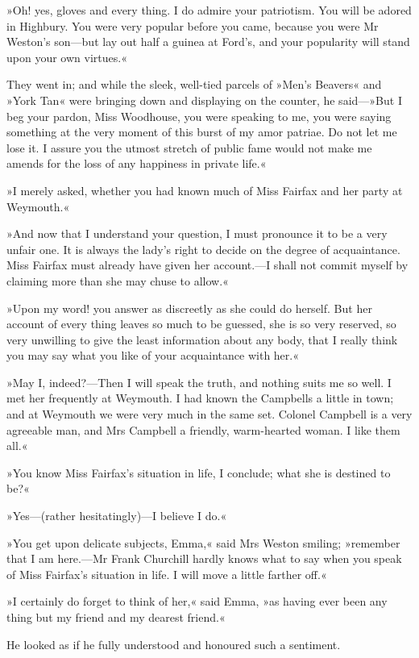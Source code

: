 »Oh! yes, gloves and every thing. I do admire your patriotism. You will be adored in Highbury. You were very popular before you came, because you were Mr Weston's son—but lay out half a guinea at Ford's, and your popularity will stand upon your own virtues.«

They went in; and while the sleek, well-tied parcels of »Men's Beavers« and »York Tan« were bringing down and displaying on the counter, he said—»But I beg your pardon, Miss Woodhouse, you were speaking to me, you were saying something at the very moment of this burst of my amor patriae. Do not let me lose it. I assure you the utmost stretch of public fame would not make me amends for the loss of any happiness in private life.«

»I merely asked, whether you had known much of Miss Fairfax and her party at Weymouth.«

»And now that I understand your question, I must pronounce it to be a very unfair one. It is always the lady's right to decide on the degree of acquaintance. Miss Fairfax must already have given her account.—I shall not commit myself by claiming more than she may chuse to allow.«

»Upon my word! you answer as discreetly as she could do herself. But her account of every thing leaves so much to be guessed, she is so very reserved, so very unwilling to give the least information about any body, that I really think you may say what you like of your acquaintance with her.«

»May I, indeed?—Then I will speak the truth, and nothing suits me so well. I met her frequently at Weymouth. I had known the Campbells a little in town; and at Weymouth we were very much in the same set. Colonel Campbell is a very agreeable man, and Mrs Campbell a friendly, warm-hearted woman. I like them all.«

»You know Miss Fairfax's situation in life, I conclude; what she is destined to be?«

»Yes—(rather hesitatingly)—I believe I do.«

»You get upon delicate subjects, Emma,« said Mrs Weston smiling; »remember that I am here.—Mr Frank Churchill hardly knows what to say when you speak of Miss Fairfax's situation in life. I will move a little farther off.«

»I certainly do forget to think of her,« said Emma, »as having ever been any thing but my friend and my dearest friend.«

He looked as if he fully understood and honoured such a sentiment.

